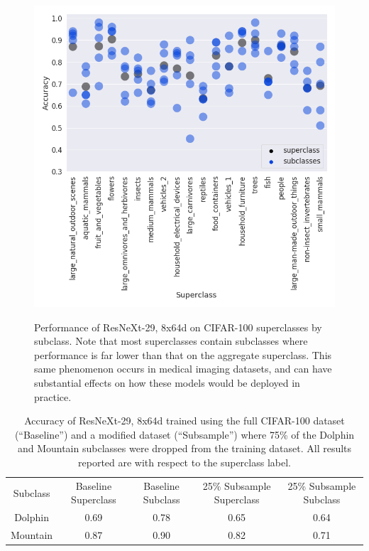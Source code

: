 \documentclass{article}
\begin{document}
 \begin{figure}[htb!]
 \centering
\includegraphics[width=5in]{Superclass-Subclass-CIFAR-100-Correct-Val-v2.png}
\label{fig:cifar}
\caption{Performance of ResNeXt-29, 8x64d on CIFAR-100 superclasses by subclass.  Note that most superclasses contain subclasses where performance is far lower than that on the aggregate superclass.  This same phenomenon occurs in medical imaging datasets, and can have substantial effects on how these models would be deployed in practice.}
\end{figure}

\begin{table}[]
\begin{tabular}{ccccc}
 Subclass & Baseline Superclass  & Baseline Subclass  & 25\% Subsample Superclass  & 25\% Subsample Subclass \\
 Dolphin & 0.69 & 0.78  & 0.65  & 0.64  \\
 Mountain & 0.87 & 0.90  & 0.82 & 0.71  \\
\end{tabular}
\label{tab:cifar1}
\caption{Accuracy of ResNeXt-29, 8x64d trained using the full CIFAR-100 dataset (``Baseline'') and a modified dataset (``Subsample'') where 75\% of the Dolphin and Mountain subclasses were dropped from the training dataset.  All results reported are with respect to the superclass label.}
\end{table}
\end{document}
